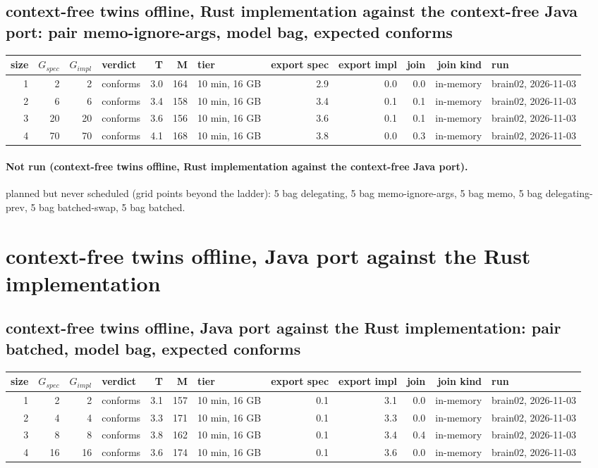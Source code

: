 \documentclass[10pt]{article}
\begin{document}
\subsection*{context-free twins offline, Rust implementation against the context-free Java port: pair \textsf{memo-ignore-args}, model bag, expected conforms}
\begin{longtable}{@{}rrrlrrlrrrrl@{}}
\toprule
size & $G_{\mathit{spec}}$ & $G_{\mathit{impl}}$ & verdict & T & M & tier & export spec & export impl & join & join kind & run \\
\midrule
\endhead
\color{red} 1 & 2 & 2 & conforms & 3.0 & 164 & 10 min, 16 GB & 2.9 & 0.0 & 0.0 & in-memory & brain02, 2026-11-03 \\
\color{red} 2 & 6 & 6 & conforms & 3.4 & 158 & 10 min, 16 GB & 3.4 & 0.1 & 0.1 & in-memory & brain02, 2026-11-03 \\
\color{red} 3 & 20 & 20 & conforms & 3.6 & 156 & 10 min, 16 GB & 3.6 & 0.1 & 0.1 & in-memory & brain02, 2026-11-03 \\
\color{red} 4 & 70 & 70 & conforms & 4.1 & 168 & 10 min, 16 GB & 3.8 & 0.0 & 0.3 & in-memory & brain02, 2026-11-03 \\
\bottomrule
\end{longtable}
\paragraph{Not run (context-free twins offline, Rust implementation against the context-free Java port).}
planned but never scheduled (grid points beyond the ladder): 5 bag delegating, 5 bag memo-ignore-args, 5 bag memo, 5 bag delegating-prev, 5 bag batched-swap, 5 bag batched.\par
\section*{context-free twins offline, Java port against the Rust implementation}
\subsection*{context-free twins offline, Java port against the Rust implementation: pair \textsf{batched}, model bag, expected conforms}
\begin{longtable}{@{}rrrlrrlrrrrl@{}}
\toprule
size & $G_{\mathit{spec}}$ & $G_{\mathit{impl}}$ & verdict & T & M & tier & export spec & export impl & join & join kind & run \\
\midrule
\endhead
\color{red} 1 & 2 & 2 & conforms & 3.1 & 157 & 10 min, 16 GB & 0.1 & 3.1 & 0.0 & in-memory & brain02, 2026-11-03 \\
\color{red} 2 & 4 & 4 & conforms & 3.3 & 171 & 10 min, 16 GB & 0.1 & 3.3 & 0.0 & in-memory & brain02, 2026-11-03 \\
\color{red} 3 & 8 & 8 & conforms & 3.8 & 162 & 10 min, 16 GB & 0.1 & 3.4 & 0.4 & in-memory & brain02, 2026-11-03 \\
\color{red} 4 & 16 & 16 & conforms & 3.6 & 174 & 10 min, 16 GB & 0.1 & 3.6 & 0.0 & in-memory & brain02, 2026-11-03 \\
\bottomrule
\end{longtable}
\end{document}
